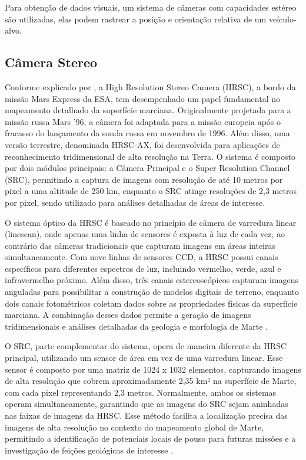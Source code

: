 Para obtenção de dados visuais, um sistema de câmeras com capacidades estéreo são utilizadas, elas podem rastrear a posição e orientação relativa de um veículo-alvo.

\subsection{Câmera Stereo}

Conforme explicado por \cite{esaMarsExpress}, a High Resolution Stereo Camera (HRSC), a bordo da missão Mars Express da ESA, tem desempenhado um papel fundamental no mapeamento detalhado da superfície marciana. Originalmente projetada para a missão russa Mars '96, a câmera foi adaptada para a missão europeia após o fracasso do lançamento da sonda russa em novembro de 1996. Além disso, uma versão terrestre, denominada HRSC-AX, foi desenvolvida para aplicações de reconhecimento tridimensional de alta resolução na Terra. O sistema é composto por dois módulos principais: a Câmera Principal e o Super Resolution Channel (SRC), permitindo a captura de imagens com resolução de até 10 metros por pixel a uma altitude de 250 km, enquanto o SRC atinge resoluções de 2,3 metros por pixel, sendo utilizado para análises detalhadas de áreas de interesse.

O sistema óptico da HRSC é baseado no princípio de câmera de varredura linear (linescan), onde apenas uma linha de sensores é exposta à luz de cada vez, ao contrário das câmeras tradicionais que capturam imagens em áreas inteiras simultaneamente. Com nove linhas de sensores CCD, a HRSC possui canais específicos para diferentes espectros de luz, incluindo vermelho, verde, azul e infravermelho próximo. Além disso, três canais estereoscópicos capturam imagens anguladas para possibilitar a construção de modelos digitais de terreno, enquanto dois canais fotométricos coletam dados sobre as propriedades físicas da superfície marciana. A combinação desses dados permite a geração de imagens tridimensionais e análises detalhadas da geologia e morfologia de Marte \cite{esaMarsExpress}.

O SRC, parte complementar do sistema, opera de maneira diferente da HRSC principal, utilizando um sensor de área em vez de uma varredura linear. Esse sensor é composto por uma matriz de 1024 x 1032 elementos, capturando imagens de alta resolução que cobrem aproximadamente 2,35 km² na superfície de Marte, com cada pixel representando 2,3 metros. Normalmente, ambos os sistemas operam simultaneamente, garantindo que as imagens do SRC sejam aninhadas nas faixas de imagens da HRSC. Esse método facilita a localização precisa das imagens de alta resolução no contexto do mapeamento global de Marte, permitindo a identificação de potenciais locais de pouso para futuras missões e a investigação de feições geológicas de interesse \cite{esaMarsExpress}.
